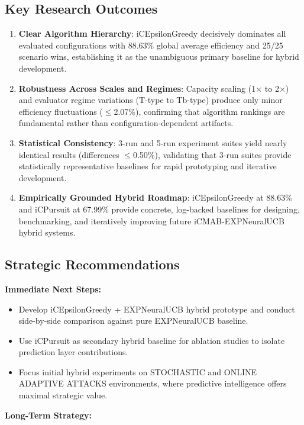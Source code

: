 \documentclass[12pt,a4paper]{article}
\begin{document}
\subsection{Key Research Outcomes}

\begin{enumerate}
\item \textbf{Clear Algorithm Hierarchy}: iCEpsilonGreedy decisively dominates all evaluated configurations with 88.63\% global average efficiency and 25/25 scenario wins, establishing it as the unambiguous primary baseline for hybrid development.
\item \textbf{Robustness Across Scales and Regimes}: Capacity scaling (1$\times$ to 2$\times$) and evaluator regime variations (T-type to Tb-type) produce only minor efficiency fluctuations ($\leq$2.07\%), confirming that algorithm rankings are fundamental rather than configuration-dependent artifacts.
\item \textbf{Statistical Consistency}: 3-run and 5-run experiment suites yield nearly identical results (differences $\leq$0.50\%), validating that 3-run suites provide statistically representative baselines for rapid prototyping and iterative development.
\item \textbf{Empirically Grounded Hybrid Roadmap}: iCEpsilonGreedy at 88.63\% and iCPursuit at 67.99\% provide concrete, log-backed baselines for designing, benchmarking, and iteratively improving future iCMAB-EXPNeuralUCB hybrid systems.
\end{enumerate}

\subsection{Strategic Recommendations}

\textbf{Immediate Next Steps:}

\begin{itemize}
\item Develop iCEpsilonGreedy + EXPNeuralUCB hybrid prototype and conduct side-by-side comparison against pure EXPNeuralUCB baseline.
\item Use iCPursuit as secondary hybrid baseline for ablation studies to isolate prediction layer contributions.
\item Focus initial hybrid experiments on STOCHASTIC and ONLINE ADAPTIVE ATTACKS environments, where predictive intelligence offers maximal strategic value.
\end{itemize}

\textbf{Long-Term Strategy:}
\end{document}
